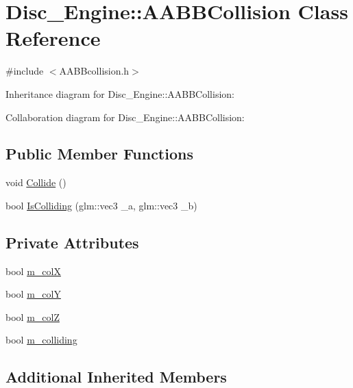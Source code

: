 \hypertarget{class_disc___engine_1_1_a_a_b_b_collision}{}\section{Disc\+\_\+\+Engine\+:\+:A\+A\+B\+B\+Collision Class Reference}
\label{class_disc___engine_1_1_a_a_b_b_collision}


{\ttfamily \#include $<$A\+A\+B\+Bcollision.\+h$>$}



Inheritance diagram for Disc\+\_\+\+Engine\+:\+:A\+A\+B\+B\+Collision\+:


Collaboration diagram for Disc\+\_\+\+Engine\+:\+:A\+A\+B\+B\+Collision\+:
\subsection*{Public Member Functions}
\begin{DoxyCompactItemize}
\item 
void \mbox{\hyperlink{class_disc___engine_1_1_a_a_b_b_collision_add1a655c6cba12912408d4fcfd060bc7}{Collide}} ()
\item 
bool \mbox{\hyperlink{class_disc___engine_1_1_a_a_b_b_collision_a4cd54ec5a91a6ed67ee896ff89f4dafc}{Is\+Colliding}} (glm\+::vec3 \+\_\+a, glm\+::vec3 \+\_\+b)
\end{DoxyCompactItemize}
\subsection*{Private Attributes}
\begin{DoxyCompactItemize}
\item 
bool \mbox{\hyperlink{class_disc___engine_1_1_a_a_b_b_collision_a2fea77be5fb7f04883ae176e3608bec9}{m\+\_\+colX}}
\item 
bool \mbox{\hyperlink{class_disc___engine_1_1_a_a_b_b_collision_a374b9917361a1a535747f6e6ccda14cb}{m\+\_\+colY}}
\item 
bool \mbox{\hyperlink{class_disc___engine_1_1_a_a_b_b_collision_a7280d4f5b437af6f2aa029d43bcd4724}{m\+\_\+colZ}}
\item 
bool \mbox{\hyperlink{class_disc___engine_1_1_a_a_b_b_collision_ab8a1692b241d750c38e6bc940346ff9f}{m\+\_\+colliding}}
\end{DoxyCompactItemize}
\subsection*{Additional Inherited Members}


